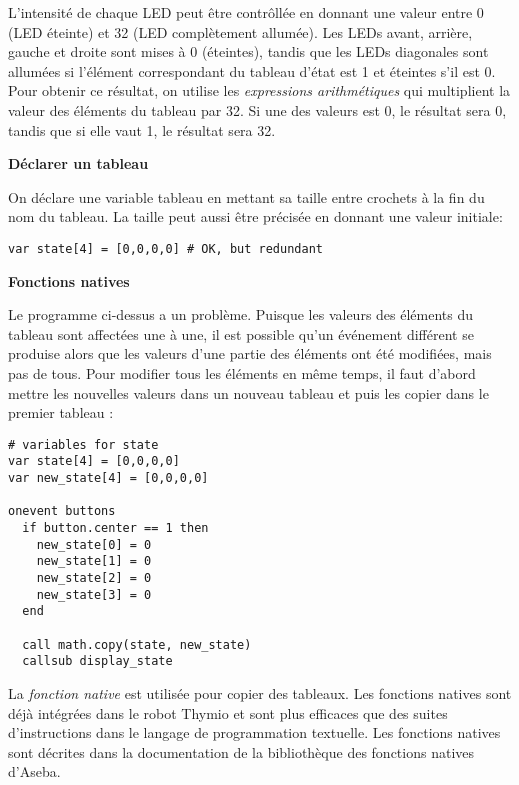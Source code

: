 L'intensité de chaque LED peut être contrôllée en donnant une valeur entre 0 (LED éteinte)
et 32 (LED complètement allumée).
Les LEDs avant, arrière, gauche et droite sont mises à 0 (éteintes), tandis que les LEDs diagonales
sont allumées si l'élément correspondant du tableau d'état est 1
et éteintes s'il est 0.
Pour obtenir ce résultat, on utilise les \emph{expressions arithmétiques} 
qui multiplient la valeur des éléments du tableau par 32.
Si une des valeurs est 0, le résultat sera 0, tandis que si elle vaut 1, le résultat sera 32.

\textbf{\large Déclarer un tableau}

On déclare une variable tableau en mettant sa taille entre crochets à la fin du nom du tableau.
La taille peut aussi être précisée en donnant une valeur initiale:

\begin{footnotesize}
\begin{verbatim}
var state[4] = [0,0,0,0] # OK, but redundant
\end{verbatim}
\end{footnotesize}

\textbf{\large Fonctions natives}

Le programme ci-dessus a un problème.
Puisque les valeurs des éléments du tableau  sont affectées une à une,
il est possible qu'un événement différent se produise
alors que les valeurs d'une partie des éléments ont été modifiées, mais pas de tous.
Pour modifier tous les éléments en même temps, il faut d'abord mettre les nouvelles valeurs
dans un nouveau tableau  et puis les copier dans le premier tableau :

\begin{footnotesize}
\begin{verbatim}
# variables for state
var state[4] = [0,0,0,0]
var new_state[4] = [0,0,0,0]

onevent buttons
  if button.center == 1 then
    new_state[0] = 0
    new_state[1] = 0
    new_state[2] = 0
    new_state[3] = 0
  end
  
  call math.copy(state, new_state)
  callsub display_state
\end{verbatim}
\end{footnotesize}

La \emph{fonction native}  est utilisée pour copier des tableaux.
Les fonctions natives sont déjà intégrées dans le robot Thymio et sont plus efficaces
que des suites d'instructions dans le langage de programmation textuelle.
Les fonctions natives sont décrites dans la documentation de la bibliothèque des fonctions
natives d'Aseba.

